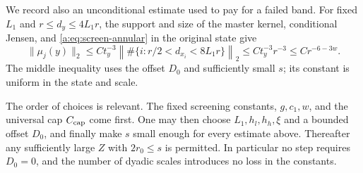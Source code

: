 We record also an unconditional estimate used to pay for a failed
band. For fixed $L_1$ and $r\le d_y\le4L_1r$, the support and
size of the master kernel, conditional Jensen, and
\eqref{a:eq:screen-annular} in the original state give
\begin{equation}\label{a:eq:cond-density-l2}
 \|\mu_j(y)\|_2
  \le Ct_y^{-3}
    \left\|\#\{i:r/2<d_{x_i}<8L_1r\}\right\|_2
  \le Ct_y^{-3}r^{-3}\le Cr^{-6-3w}.
\end{equation}
The middle inequality uses the offset $D_0$ and sufficiently small
$s$; its constant is uniform in the state and scale.

The order of choices is relevant. The fixed screening constants,
$g,c_1,w$, and the universal cap $C_{\rm cap}$ come first.
One may then choose $L_1,h_l,h_h,\xi$ and a bounded offset $D_0$,
and finally make $s$ small enough for every estimate above.
Thereafter any sufficiently large $Z$ with $2r_0\le s$ is
permitted. In particular no step requires $D_0=0$, and the
number of dyadic scales introduces no loss in the constants.
